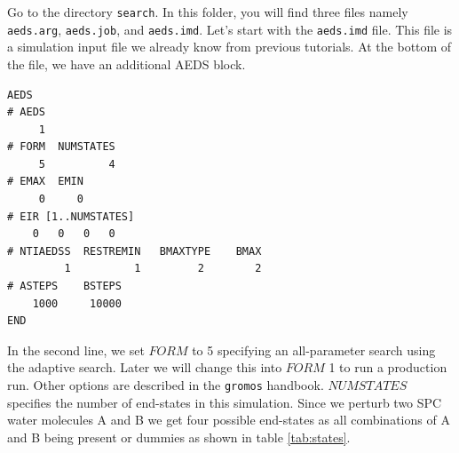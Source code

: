 Go to the directory \texttt{search}. In this folder, you will find three files namely \texttt{aeds.arg}, \texttt{aeds.job}, and \texttt{aeds.imd}. Let's start with the \texttt{aeds.imd} file. This file is a simulation input file we already know from previous tutorials. At the bottom of the file, we have an additional AEDS block.
\begin{lstlisting}
AEDS
# AEDS
     1
# FORM  NUMSTATES
     5          4
# EMAX  EMIN
     0     0
# EIR [1..NUMSTATES]
    0   0   0   0 
# NTIAEDSS  RESTREMIN   BMAXTYPE    BMAX 
         1          1         2        2    
# ASTEPS    BSTEPS
    1000     10000 
END
\end{lstlisting}
In the second line, we set $FORM$ to 5 specifying an all-parameter search using the adaptive search.
Later we will change this into $FORM$ 1 to run a production run. Other options are described in the  \texttt{gromos} handbook. $NUMSTATES$ specifies the number of end-states in this simulation. Since we perturb two SPC water molecules A and B we get four possible end-states as all combinations of A and B being present or dummies as shown in table \ref{tab:states}.

